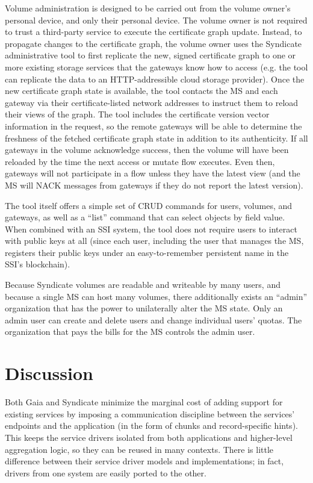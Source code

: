 Volume administration is designed to be carried out from the volume owner's
personal device, and only their personal device.  The volume owner is not
required to trust a third-party service to execute the certificate graph update.
Instead, to propagate changes
to the certificate graph, the volume owner uses the Syndicate
administrative tool to first replicate the new, signed certificate graph to one or more
existing storage services that the gateways know how to access (e.g. the tool
can replicate the data to an HTTP-addressible cloud storage provider).  Once the
new certificate graph state is available, the tool contacts the MS and
each gateway via their certificate-listed network
addresses to instruct them to reload their views of the graph.  The tool includes the
certificate version vector information in the request, so the remote gateways will be able to
determine the freshness of the fetched certificate graph state in addition to
its authenticity.  If all gateways in the volume acknowledge success, then the
volume will have been reloaded by the time the next access or mutate flow
executes.  Even then, gateways will not participate in a flow unless they have
the latest view (and the MS will NACK messages from gateways if they do not
report the latest version).

The tool itself offers a simple set of CRUD commands for users, volumes, and
gateways, as well as a ``list'' command that can select objects by field value.
When combined with an SSI system, the tool does not require users to interact with
public keys at all (since each user, including the user that manages the MS,
registers their public keys under an easy-to-remember persistent name in the
SSI's blockchain).

Because Syndicate volumes are readable and writeable by many users, and because
a single MS can host many volumes, there additionally exists an ``admin''
organization that has the power to unilaterally alter the MS state.  Only an
admin user can create and delete users and change individual users' quotas.
The organization that pays the bills for the MS controls the admin user.

\section{Discussion}

Both Gaia and Syndicate minimize the marginal cost of adding support for
existing services by imposing a communication discipline between the services'
endpoints and the application (in the form of chunks and record-specific hints).
This keeps the service drivers isolated from both applications and higher-level
aggregation logic, so they can be reused in many contexts.  There is little
difference between their service driver models and implementations; in fact,
drivers from one system are easily ported to the other.


